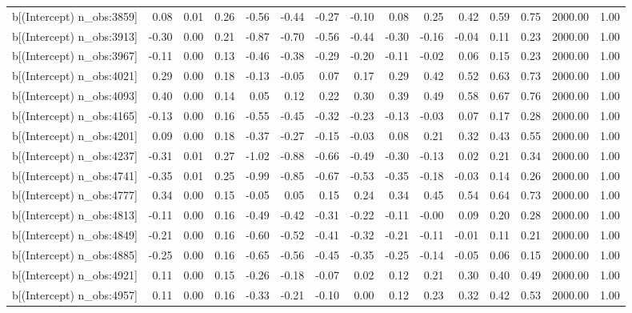 \begin{table}[ht]
\begin{tabular}{rrrrrrrrrrrrrrr}
  b[(Intercept) n\_obs:3859] & 0.08 & 0.01 & 0.26 & -0.56 & -0.44 & -0.27 & -0.10 & 0.08 & 0.25 & 0.42 & 0.59 & 0.75 & 2000.00 & 1.00 \\ 
  b[(Intercept) n\_obs:3913] & -0.30 & 0.00 & 0.21 & -0.87 & -0.70 & -0.56 & -0.44 & -0.30 & -0.16 & -0.04 & 0.11 & 0.23 & 2000.00 & 1.00 \\ 
  b[(Intercept) n\_obs:3967] & -0.11 & 0.00 & 0.13 & -0.46 & -0.38 & -0.29 & -0.20 & -0.11 & -0.02 & 0.06 & 0.15 & 0.23 & 2000.00 & 1.00 \\ 
  b[(Intercept) n\_obs:4021] & 0.29 & 0.00 & 0.18 & -0.13 & -0.05 & 0.07 & 0.17 & 0.29 & 0.42 & 0.52 & 0.63 & 0.73 & 2000.00 & 1.00 \\ 
  b[(Intercept) n\_obs:4093] & 0.40 & 0.00 & 0.14 & 0.05 & 0.12 & 0.22 & 0.30 & 0.39 & 0.49 & 0.58 & 0.67 & 0.76 & 2000.00 & 1.00 \\ 
  b[(Intercept) n\_obs:4165] & -0.13 & 0.00 & 0.16 & -0.55 & -0.45 & -0.32 & -0.23 & -0.13 & -0.03 & 0.07 & 0.17 & 0.28 & 2000.00 & 1.00 \\ 
  b[(Intercept) n\_obs:4201] & 0.09 & 0.00 & 0.18 & -0.37 & -0.27 & -0.15 & -0.03 & 0.08 & 0.21 & 0.32 & 0.43 & 0.55 & 2000.00 & 1.00 \\ 
  b[(Intercept) n\_obs:4237] & -0.31 & 0.01 & 0.27 & -1.02 & -0.88 & -0.66 & -0.49 & -0.30 & -0.13 & 0.02 & 0.21 & 0.34 & 2000.00 & 1.00 \\ 
  b[(Intercept) n\_obs:4741] & -0.35 & 0.01 & 0.25 & -0.99 & -0.85 & -0.67 & -0.53 & -0.35 & -0.18 & -0.03 & 0.14 & 0.26 & 2000.00 & 1.00 \\ 
  b[(Intercept) n\_obs:4777] & 0.34 & 0.00 & 0.15 & -0.05 & 0.05 & 0.15 & 0.24 & 0.34 & 0.45 & 0.54 & 0.64 & 0.73 & 2000.00 & 1.00 \\ 
  b[(Intercept) n\_obs:4813] & -0.11 & 0.00 & 0.16 & -0.49 & -0.42 & -0.31 & -0.22 & -0.11 & -0.00 & 0.09 & 0.20 & 0.28 & 2000.00 & 1.00 \\ 
  b[(Intercept) n\_obs:4849] & -0.21 & 0.00 & 0.16 & -0.60 & -0.52 & -0.41 & -0.32 & -0.21 & -0.11 & -0.01 & 0.11 & 0.21 & 2000.00 & 1.00 \\ 
  b[(Intercept) n\_obs:4885] & -0.25 & 0.00 & 0.16 & -0.65 & -0.56 & -0.45 & -0.35 & -0.25 & -0.14 & -0.05 & 0.06 & 0.15 & 2000.00 & 1.00 \\ 
  b[(Intercept) n\_obs:4921] & 0.11 & 0.00 & 0.15 & -0.26 & -0.18 & -0.07 & 0.02 & 0.12 & 0.21 & 0.30 & 0.40 & 0.49 & 2000.00 & 1.00 \\ 
  b[(Intercept) n\_obs:4957] & 0.11 & 0.00 & 0.16 & -0.33 & -0.21 & -0.10 & 0.00 & 0.12 & 0.23 & 0.32 & 0.42 & 0.53 & 2000.00 & 1.00 \\ 

\end{tabular}
\end{table}
